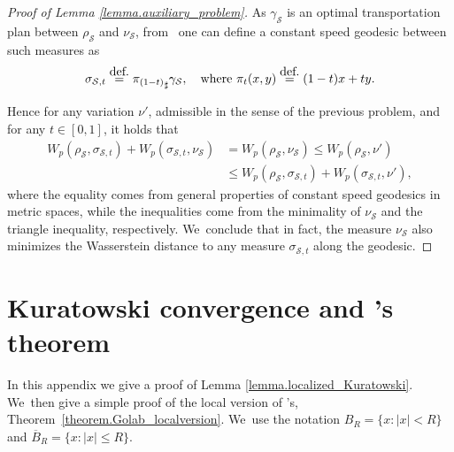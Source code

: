 \documentclass[11pt]{article}
\numberwithin{equation}{section}
\theoremstyle{definition}
\newcommand{\eqdef}{\ensuremath{\stackrel{\mbox{\upshape\tiny def.}}{=}}}
\newcommand{\oB}{\overline{B}}
\begin{document}
\begin{proof}[Proof of Lemma \ref{lemma.auxiliary_problem}]
As $\gamma_{\mathcal{S}}$ is an optimal transportation plan between $\rho_{\mathcal{S}}$ and $\nu_{\mathcal{S}}$, from~\cite[Th.\,5.27]{santambrogio2015optimal} one can define a constant speed geodesic between such measures as
\begin{equation*}
\sigma_{\mathcal{S},t} \eqdef {\pi_{(1-t)}}_\sharp\gamma_{\mathcal{S}}, \quad\text{where } \pi_t(x,y) \eqdef (1-t)x + ty.
\end{equation*}

Hence for any variation $\nu'$, admissible in the sense of the previous problem, and for any $t \in [0,1]$, it holds that
\begin{align*}
W_p\left(\rho_{\mathcal{S}}, \sigma_{\mathcal{S},t}\right) + W_p\left(\sigma_{\mathcal{S},t}, \nu_{\mathcal{S}}\right)
&=
W_p\left(\rho_{\mathcal{S}}, \nu_{\mathcal{S}}\right)
\le W_p\left(\rho_{\mathcal{S}}, \nu'\right)\\
&\le W_p\left(\rho_{\mathcal{S}}, \sigma_{\mathcal{S},t}\right) + W_p(\sigma_{\mathcal{S},t}, \nu'),
\end{align*}
where the equality comes from general properties of constant speed geodesics in metric spaces, while the inequalities come from the minimality of $\nu_{\mathcal{S}}$ and the triangle inequality, respectively. We~conclude that in fact, the measure $\nu_{\mathcal{S}}$ also minimizes the Wasserstein distance to any measure $\sigma_{\mathcal{S},t}$ along the geodesic.
\end{proof}

\section{Kuratowski convergence and \Golab's theorem}\label{appendix.kuratowski_convergence}
In this appendix we give a proof of Lemma \ref{lemma.localized_Kuratowski}. We~then give a simple proof
of the local version of \Golab's, Theorem~\ref{theorem.Golab_localversion}. We~use the notation $B_R=\{x: |x|<R\}$ and $\oB_R = \{x:|x|\le R\}$.
\end{document}
